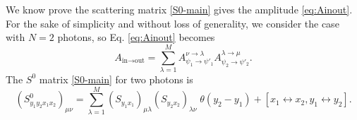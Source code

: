 \documentclass[notitlepage, prx, preprint, amsmath,superscriptaddress,amssymb]{revtex4-1}
\begin{document}
We know prove the scattering matrix \eqref{S0-main} gives the amplitude \eqref{eq:Ainout}. For the sake of simplicity and without loss of generality, we consider the case with $N=2$ photons, so Eq. \eqref{eq:Ainout} becomes
\begin{equation}\label{eq:A}
A_{\text{in}\to\text{out}} =  \sum_{\lambda=1}^M A_{\psi_1\to \psi'_1}^{\nu\to\lambda} A_{\psi_2\to \psi'_2}^{\lambda\to\mu}.
\end{equation}
The $S^0$ matrix \eqref{S0-main} for two photons is
\begin{equation}\label{eq:S0_2}
(S^0_{y_1y_2x_1x_2})_{\mu\nu} = \sum_{\lambda=1}^M (S_{y_1x_1})_{\mu\lambda}(S_{y_2x_2})_{\lambda\nu}\;\theta(y_2-y_1) + [x_1\leftrightarrow x_2,y_1\leftrightarrow y_2].
\end{equation}
\end{document}
